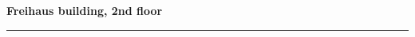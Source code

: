 \documentclass[a4paper]{article}
\begin{document}
\begin{center}
	{\Large\bf Freihaus building, 2nd floor}
	\\[5mm]
	\rule{220mm}{1pt}
	\\[10mm]
\end{center}

\begin{center}
\hspace*{-30pt}

\end{center}
\end{document}
